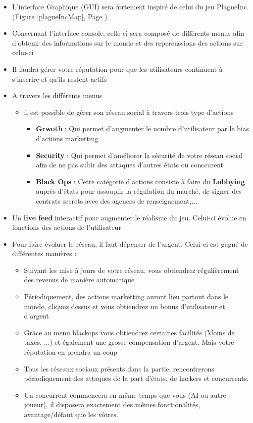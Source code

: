 \begin{itemize}
    \item L'interface Graphique (GUI) sera fortement inspiré de celui du jeu PlagueInc. (Figure \ref{plagueIncMap}, Page \pageref{plagueIncMap})
    \item Concernant l'interface console, celle-ci sera composé de différents menus afin d'obtenir des informations sur le monde et des repercussions des actions sur celui-ci
    
    \item Il faudra gérer votre réputation pour que les utilisateurs continuent à s'inscrire et qu'ils restent actifs
    
    \item A travers les différents menus
    
    \begin{itemize}
        \item il est possible de gérer son réseau social à travers trois type d'actions
    
        \begin{itemize}
            \item \textbf{Grwoth} : Qui permet d'augmenter le nombre d'utilisateur par le bias d'actions marketting
            \item \textbf{Security} : Qui permet d'améliorer la sécurité de votre réseau social afin de ne pas subir des attaques d'autres états ou conccurent
            \item \textbf{Black Ops} : Cette catégorie d'actions consiste à faire du \textbf{Lobbying} auprès d'états pour assouplir la régulation du marché, de signer des contrats secrets avec des agences de renseignement,...
        \end{itemize}
        \end{itemize}
        \item{Un \textbf{live feed} interactif pour augmenter le réalisme du jeu. Celui-ci évolue en fonctions des actions de l'utilisateur}
        \item Pour faire évoluer le réseau, il faut dépenser de l'argent. Celui-ci est gagné de différentes manières : 
        \begin{itemize}
            \item Suivant les mise à jours de votre réseau, vous obtiendrez régulièrement des revenus de manière automatique
            \item Périodiquement, des actions marketting auront lieu partout dans le monde, cliquez dessus et vous obtiendrez un bonus d'utilisateur et d'argent
            \item Grâce au menu blackops vous obtiendrez certaines facilités (Moins de taxes, ...) et également une grosse compensation d'argent. Mais votre réputation en prendra un coup
        \item Tous les réseaux sociaux présents dans la partie, rencontrerons périodiquement des attaques de la part d'états, de hackers et concurrents.
        \item Un concurrent commencera en même temps que vous (AI ou autre joueur), il disposera exactement des mêmes fonctionalités, avantage/défaut que les vôtres.
    \end{itemize}
    

\end{itemize}
